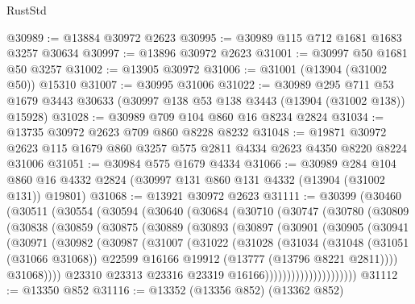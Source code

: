 \begin{lexlean}{RustStd}
\begin{coremodule}
@30989 := @13884 @30972 @2623
@30995 := @30989 @115 @712 @1681 @1683 @3257 @30634
@30997 := @13896 @30972 @2623
@31001 := @30997 @50 @1681 @50 @3257
@31002 := @13905 @30972
@31006 := @31001 (@13904 (@31002 @50)) @15310
@31007 := @30995 @31006
@31022 := @30989
    @295
    @711
    @53
    @1679
    @3443
    @30633
    (@30997 @138 @53 @138 @3443 (@13904 (@31002 @138)) @15928)
@31028 := @30989 @709 @104 @860 @16 @8234 @2824
@31034 := @13735 @30972 @2623 @709 @860 @8228 @8232
@31048 := @19871 @30972 @2623 @115 @1679 @860 @3257 @575 @2811 @4334 @2623 @4350 @8220 @8224 @31006
@31051 := @30984 @575 @1679 @4334
@31066 := @30989
    @284
    @104
    @860
    @16
    @4332
    @2824
    (@30997 @131 @860 @131 @4332 (@13904 (@31002 @131)) @19801)
@31068 := @13921 @30972 @2623
@31111 := @30399
    (@30460
      (@30511
        (@30554
          (@30594
            (@30640
              (@30684
                (@30710
                  (@30747
                    (@30780
                      (@30809
                        (@30838
                          (@30859
                            (@30875
                              (@30889
                                (@30893
                                  (@30897
                                    (@30901
                                      (@30905
                                        (@30941
                                          (@30971
                                            (@30982
                                              (@30987
                                                (@31007
                                                  (@31022
                                                    (@31028
                                                      (@31034
                                                        (@31048
                                                          (@31051 (@31066 @31068))
                                                          @22599
                                                          @16166
                                                          @19912
                                                          (@13777 (@13796 @8221 @2811))))
                                                      @31068))))
                                              @23310
                                              @23313
                                              @23316
                                              @23319
                                              @16166)))))))))))))))))))))
@31112 := @13350 @852
@31116 := @13352 (@13356 @852) (@13362 @852)

\end{coremodule}
\end{lexlean}
